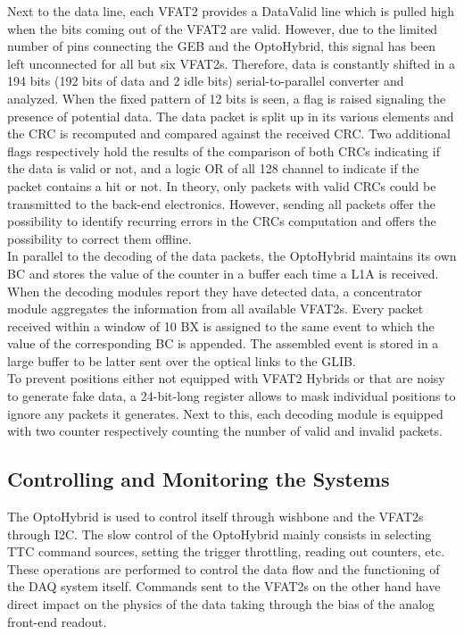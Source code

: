       Next to the data line, each VFAT2 provides a DataValid line which is pulled high when the bits coming out of the VFAT2 are valid. However, due to the limited number of pins connecting the GEB and the OptoHybrid, this signal has been left unconnected for all but six VFAT2s. Therefore, data is constantly shifted in a 194 bits (192 bits of data and 2 idle bits) serial-to-parallel converter and analyzed. When the fixed pattern of 12 bits is seen, a flag is raised signaling the presence of potential data. The data packet is split up in its various elements and the CRC is recomputed and compared against the received CRC. Two additional flags respectively hold the results of the comparison of both CRCs indicating if the data is valid or not, and a logic OR of all 128 channel to indicate if the packet contains a hit or not. In theory, only packets with valid CRCs could be transmitted to the back-end electronics. However, sending all packets offer the possibility to identify recurring errors in the CRCs computation and offers the possibility to correct them offline. \\

      In parallel to the decoding of the data packets, the OptoHybrid maintains its own BC and stores the value of the counter in a buffer each time a L1A is received. When the decoding modules report they have detected data, a concentrator module aggregates the information from all available VFAT2s. Every packet received within a window of 10 BX is assigned to the same event to which the value of the corresponding BC is appended. The assembled event is stored in a large buffer to be latter sent over the optical links to the GLIB. \\

      To prevent positions either not equipped with VFAT2 Hybrids or that are noisy to generate fake data, a 24-bit-long register allows to mask individual positions to ignore any packets it generates. Next to this, each decoding module is equipped with two counter respectively counting the number of valid and invalid packets.

    \subsection{Controlling and Monitoring the Systems}

      The OptoHybrid is used to control itself through wishbone and the VFAT2s through I2C. The slow control of the OptoHybrid mainly consists in selecting TTC command sources, setting the trigger throttling, reading out counters, etc. These operations are performed to control the data flow and the functioning of the DAQ system itself. Commands sent to the VFAT2s on the other hand have direct impact on the physics of the data taking through the bias of the analog front-end readout. \\

